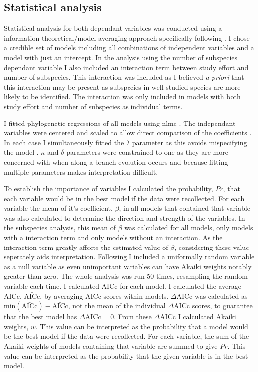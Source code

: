 \subsection{Statistical analysis}

Statistical analysis for both dependant variables was conducted using a information theoretical/model averaging approach \cite{burnham2002model} specifically following \cite{whittingham2005habitat, whittingham2006we}.
I chose a credible set of models including all combinations of independent variables and a model with just an intercept.
In the analysis using the number of subspecies dependant variable I also included an interaction term between study effort and number of subspecies.
This interaction was included as I believed \emph{a priori} that this interaction may be present as subspecies in well studied species are more likely to be identified.
The interaction was only included in models with both study effort and number of subspecies as individual terms.

I fitted phylogenetic regressions of all models using nlme \cite{nlme}.
The independant variables were centered and scaled to allow direct comparison of the coefficients \cite{schielzeth2010simple}.
In each case I simultaneously fitted the $\lambda$ parameter as this avoids mispecifying the model \cite{revell2010phylogenetic}.
$\kappa$ and $\delta$ parameters were constrained to one as they are more concerned with when along a branch evolution occurs and because fitting multiple parameters makes interpretation difficult. 

To establish the importance of variables I calculated the probability, $Pr$, that each variable would be in the best model if the data were recollected.
For each variable the mean of it's coefficient, $\beta$, in all models that contained that variable was also calculated to determine the direction and strength of the variables.
In the subspecies analysis, this mean of $\beta$ was calculated for all models, only models with a interaction term and only models without an interaction.
As the interaction term greatly affects the estimated value of $\beta$, considering these value seperately aids interpretation.
Following \cite{whittingham2005habitat} I included a uniformally random variable as a null variable as even unimportant variables can have Akaiki weights notably greater than zero.
The whole analysis was run 50 times, resampling the random variable each time.
I calculated AICc for each model.
I calculated the average AICc, $\bar{\text{AICc}}$, by averaging AICc scores within models.
$\Delta\text{AICc}$ was calculated as $\text{min}(\bar{\text{AICc}}) - \bar{\text{AICc}}$, not the mean of the individual $\Delta\text{AICc}$ scores, to guarantee that the best model has $\Delta\text{AICc} = 0$.
From these $\Delta\text{AICc}$ I calculated Akaiki weights, $w$.
This value can be interpreted as the probability that a model would be the best model if the data were recollected.
For each variable, the sum of the Akaiki weights of models containing that variable are summed to give $Pr$.
This value can be interpreted as the probability that the given variable is in the best model.



